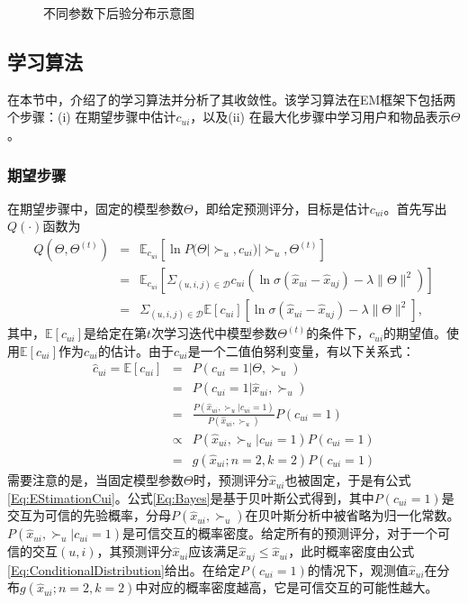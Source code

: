 \begin{figure*}[t]
	\centering
	\caption{不同参数下后验分布示意图}
	\label{Fig:Posterior}
\end{figure*}

\subsection{学习算法}
在本节中，介绍了的学习算法并分析了其收敛性。该学习算法在EM框架下包括两个步骤：(i) 在期望步骤中估计$c_{ui}$，以及(ii) 在最大化步骤中学习用户和物品表示$\Theta$。

\subsubsection{期望步骤}
在期望步骤中，固定的模型参数$\Theta$，即给定预测评分，目标是估计$c_{ui}$。首先写出$Q(\cdot)$函数为 
\begin{eqnarray}\label{Eq:QDef}
 Q(\Theta, \Theta^{(t)}) 
	& = & \mathbb{E}_{c_{ui} } \left[ \ln P(\Theta|\succ_u, c_{ui}) | \succ_u, \Theta^{(t)} \right] \nonumber \\
	& = & \mathbb{E}_{c_{ui}} \left[ \Sigma_{(u,i,j)\in \mathcal{D}} c_{ui} \left( \ln \sigma(\hat{x}_{ui} - \hat{x}_{uj}) - \lambda \| \Theta \|^2 \right) \right] \nonumber \\
	& = & \Sigma_{(u,i,j) \in \mathcal{D}} \mathbb{E}[c_{ui}] \left[ \ln \sigma(\hat{x}_{ui} - \hat{x}_{uj}) - \lambda \| \Theta \|^2 \right],
\end{eqnarray}
其中，$\mathbb{E}[c_{ui}]$是给定在第$t$次学习迭代中模型参数$\Theta^{(t)}$的条件下，$c_{ui}$的期望值。使用$\mathbb{E}[c_{ui}]$作为$c_{ui}$的估计。由于$c_{ui}$是一个二值伯努利变量，有以下关系式：
\begin{eqnarray}
 \hat{c}_{ui}=	\mathbb{E}[c_{ui}] &=& P({c_{ui}} = 1|\Theta,{ \succ _u}) \nonumber \\
	&=& P({c_{ui}} = 1|{\hat{x}_{ui}} ,\succ_u)  \label{Eq:EStimationCui} \\
	&=& \frac{ P( {\hat{x}_{ui}},{ \succ_u}|{c_{ui}} = 1)}{ P({\hat{x}_{ui}} ,\succ_u)}{P({c_{ui}} = 1)} \label{Eq:Bayes}\\
	&\propto& P( {\hat{x}_{ui}},{ \succ_u}|{c_{ui}} = 1)P({c_{ui}} = 1) \label{Eq:Bayesian} \\
	&=& g({{\hat x}_{ui};n=2,k=2})P({c_{ui}} = 1) \label{Eq:ClassDensity}
\end{eqnarray}
需要注意的是，当固定模型参数$\Theta$时，预测评分$\hat{x}_{ui}$也被固定，于是有公式\eqref{Eq:EStimationCui}。公式\eqref{Eq:Bayes}是基于贝叶斯公式得到，其中$P(c_{ui}=1)$是交互为可信的先验概率，分母$P(\hat{x}_{ui},\succ_u)$在贝叶斯分析中被省略为归一化常数。$P(\hat{x}_{ui},\succ_u|c_{ui}=1)$是可信交互的概率密度。给定所有的预测评分，对于一个可信的交互$(u,i)$，其预测评分$\hat{x}_{ui}$应该满足$\hat{x}_{uj} \leq \hat{x}_{ui}$，此时概率密度由公式\eqref{Eq:ConditionalDistribution}给出。在给定$P(c_{ui}=1)$的情况下，观测值$\hat{x}_{ui}$在分布$g({{\hat x}_{ui};n=2,k=2})$中对应的概率密度越高，它是可信交互的可能性越大。

